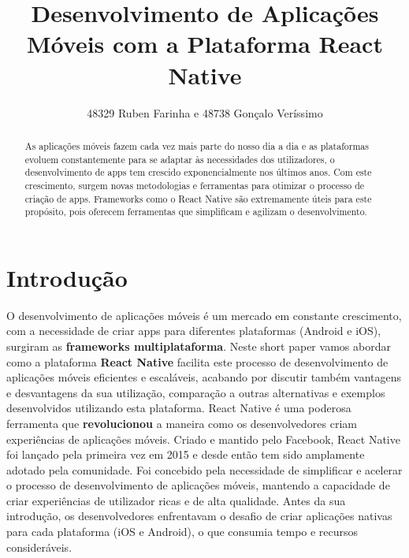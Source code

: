\documentclass[runningheads]{llncs}
\begin{document}
%
\title{Desenvolvimento de Aplicações Móveis com a Plataforma React Native}
%
%
\author{48329 Ruben Farinha e 48738 Gonçalo Veríssimo}
%
%
%
\maketitle              %
%
\begin{abstract}
As aplicações móveis fazem cada vez mais parte do nosso dia a dia e as plataformas evoluem constantemente para se adaptar às necessidades dos utilizadores, o desenvolvimento de apps tem crescido exponencialmente nos últimos anos. Com este crescimento, surgem novas metodologias e ferramentas para otimizar o processo de criação de apps. Frameworks como o React Native são extremamente úteis para este propósito, pois oferecem ferramentas que simplificam e agilizam o desenvolvimento.

\end{abstract}
%
%
%
\section{Introdução}
O desenvolvimento de aplicações móveis é um mercado em constante crescimento, com a necessidade de criar apps para diferentes plataformas (Android e iOS), surgiram as \textbf{frameworks multiplataforma}. Neste short paper vamos abordar como a plataforma \textbf{React Native} facilita este processo de desenvolvimento de aplicações móveis eficientes e escaláveis, acabando por discutir também vantagens e desvantagens da sua utilização, comparação a outras alternativas e exemplos desenvolvidos utilizando esta plataforma.
React Native é uma poderosa ferramenta que \textbf{revolucionou} a maneira como os desenvolvedores criam experiências de aplicações móveis. Criado e mantido pelo Facebook, React Native foi lançado pela primeira vez em 2015 e desde então tem sido amplamente adotado pela comunidade. Foi concebido pela necessidade de simplificar e acelerar o processo de desenvolvimento de aplicações móveis, mantendo a capacidade de criar experiências de utilizador ricas e de alta qualidade. Antes da sua introdução, os desenvolvedores enfrentavam o desafio de criar aplicações nativas para cada plataforma (iOS e Android), o que consumia tempo e recursos consideráveis.
\end{document}
